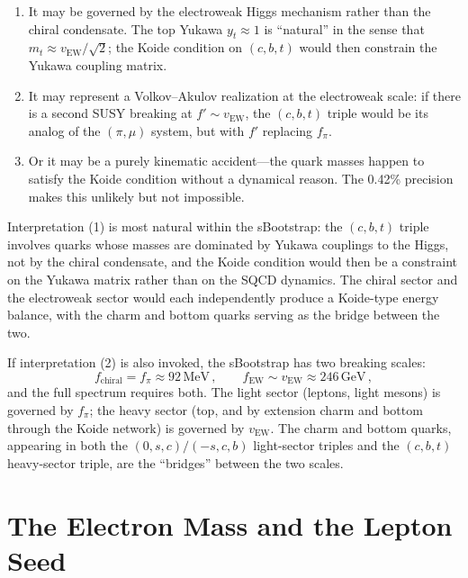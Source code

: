 \documentclass[12pt,a4paper]{article}
\newcommand{\MeV}{\,\text{MeV}}
\newcommand{\GeV}{\,\text{GeV}}
\begin{document}
\begin{enumerate}
\item It may be governed by the electroweak Higgs mechanism rather 
than the chiral condensate. The top Yukawa $y_t \approx 1$ is 
``natural'' in the sense that $m_t \approx v_{\text{EW}}/\sqrt{2}$; 
the Koide condition on $(c,b,t)$ would then constrain the Yukawa 
coupling matrix.
\item It may represent a Volkov--Akulov realization at the 
electroweak scale: if there is a second SUSY breaking at 
$f' \sim v_{\text{EW}}$, the $(c,b,t)$ triple would be its 
analog of the $(\pi, \mu)$ system, but with $f'$ replacing $f_\pi$.
\item Or it may be a purely kinematic accident---the quark masses 
happen to satisfy the Koide condition without a dynamical reason. 
The 0.42\% precision makes this unlikely but not impossible.
\end{enumerate}

Interpretation (1) is most natural within the sBootstrap: the 
$(c,b,t)$ triple involves quarks whose masses are dominated by 
Yukawa couplings to the Higgs, not by the chiral condensate, and the 
Koide condition would then be a constraint on the Yukawa matrix 
rather than on the SQCD dynamics. The chiral sector and the 
electroweak sector would each independently produce a Koide-type 
energy balance, with the charm and bottom quarks serving as the 
bridge between the two.

If interpretation (2) is also invoked, the sBootstrap has two breaking 
scales:
\begin{equation}
f_{\text{chiral}} = f_\pi \approx 92\MeV\,, \qquad
f_{\text{EW}} \sim v_{\text{EW}} \approx 246\GeV\,,
\end{equation}
and the full spectrum requires both. The light sector (leptons, 
light mesons) is governed by $f_\pi$; the heavy sector (top, and 
by extension charm and bottom through the Koide network) is 
governed by $v_{\text{EW}}$. The charm and bottom quarks, 
appearing in both the $(0,s,c)/(-s,c,b)$ light-sector triples 
and the $(c,b,t)$ heavy-sector triple, are the ``bridges'' 
between the two scales.

\section{The Electron Mass and the Lepton Seed}
\label{sec:electron}
\end{document}
